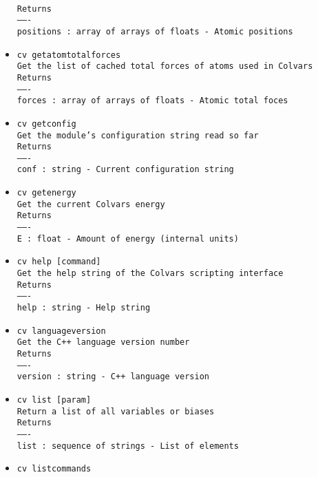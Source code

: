 \begin{itemize}
\\
\texttt{Returns}
\\
\texttt{-------}
\\
\texttt{positions : array of arrays of floats - Atomic positions}
\item \texttt{cv getatomtotalforces}
\\
\texttt{Get the list of cached total forces of atoms used in Colvars}
\\
\texttt{Returns}
\\
\texttt{-------}
\\
\texttt{forces : array of arrays of floats - Atomic total foces}
\item \texttt{cv getconfig}
\\
\texttt{Get the module's configuration string read so far}
\\
\texttt{Returns}
\\
\texttt{-------}
\\
\texttt{conf : string - Current configuration string}
\item \texttt{cv getenergy}
\\
\texttt{Get the current Colvars energy}
\\
\texttt{Returns}
\\
\texttt{-------}
\\
\texttt{E : float - Amount of energy (internal units)}
\item \texttt{cv help [command]}
\\
\texttt{Get the help string of the Colvars scripting interface}
\\
\texttt{Returns}
\\
\texttt{-------}
\\
\texttt{help : string - Help string}
\item \texttt{cv languageversion}
\\
\texttt{Get the C++ language version number}
\\
\texttt{Returns}
\\
\texttt{-------}
\\
\texttt{version : string - C++ language version}
\item \texttt{cv list [param]}
\\
\texttt{Return a list of all variables or biases}
\\
\texttt{Returns}
\\
\texttt{-------}
\\
\texttt{list : sequence of strings - List of elements}
\item \texttt{cv listcommands}

\end{itemize}
